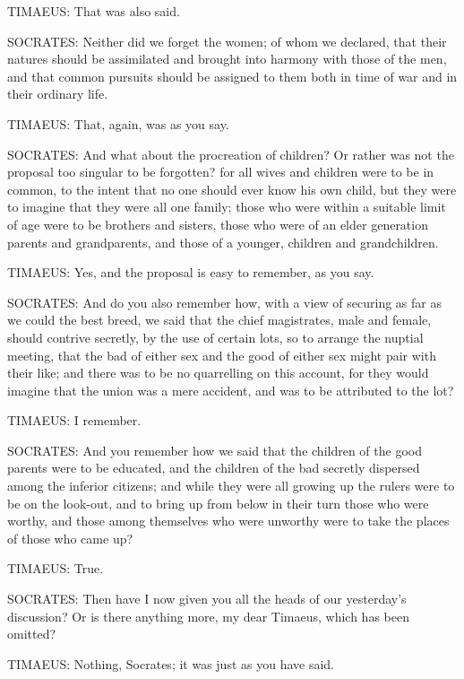 TIMAEUS: That was also said.

SOCRATES: Neither did we forget the women; of whom we declared, that their
natures should be assimilated and brought into harmony with those of the
men, and that common pursuits should be assigned to them both in time of
war and in their ordinary life.

TIMAEUS: That, again, was as you say.

SOCRATES: And what about the procreation of children? Or rather was not
the proposal too singular to be forgotten? for all wives and children were
to be in common, to the intent that no one should ever know his own child,
but they were to imagine that they were all one family; those who were
within a suitable limit of age were to be brothers and sisters, those who
were of an elder generation parents and grandparents, and those of a
younger, children and grandchildren.

TIMAEUS: Yes, and the proposal is easy to remember, as you say.

SOCRATES: And do you also remember how, with a view of securing as far as
we could the best breed, we said that the chief magistrates, male and
female, should contrive secretly, by the use of certain lots, so to
arrange the nuptial meeting, that the bad of either sex and the good of
either sex might pair with their like; and there was to be no quarrelling
on this account, for they would imagine that the union was a mere
accident, and was to be attributed to the lot?

TIMAEUS: I remember.

SOCRATES: And you remember how we said that the children of the good
parents were to be educated, and the children of the bad secretly
dispersed among the inferior citizens; and while they were all growing up
the rulers were to be on the look-out, and to bring up from below in their
turn those who were worthy, and those among themselves who were unworthy
were to take the places of those who came up?

TIMAEUS: True.

SOCRATES: Then have I now given you all the heads of our yesterday’s
discussion? Or is there anything more, my dear Timaeus, which has been
omitted?

TIMAEUS: Nothing, Socrates; it was just as you have said.

